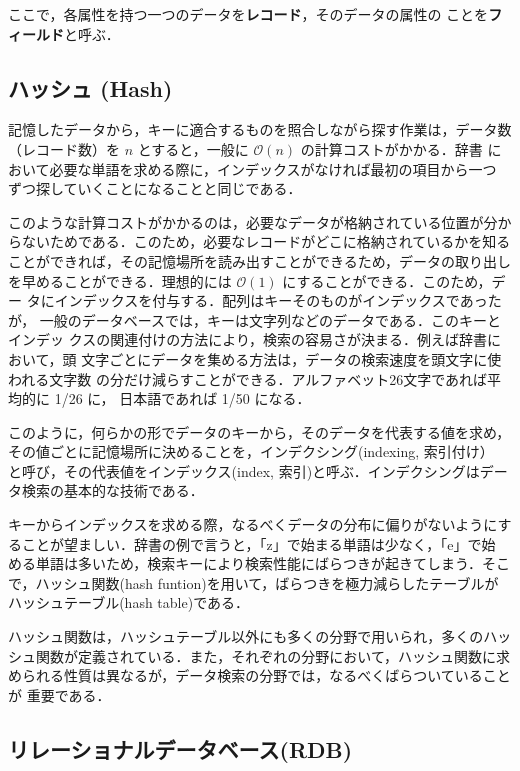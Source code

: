 ここで，各属性を持つ一つのデータを\textbf{レコード}，そのデータの属性の
ことを\textbf{フィールド}と呼ぶ．

\subsection{ハッシュ (Hash)}

記憶したデータから，キーに適合するものを照合しながら探す作業は，データ数
（レコード数）を $n$ とすると，一般に $\mathcal{O}(n)$ の計算コストがかかる．辞書
において必要な単語を求める際に，インデックスがなければ最初の項目から一つ
ずつ探していくことになることと同じである．

このような計算コストがかかるのは，必要なデータが格納されている位置が分か
らないためである．このため，必要なレコードがどこに格納されているかを知る
ことができれば，その記憶場所を読み出すことができるため，データの取り出し
を早めることができる．理想的には $\mathcal{O}(1)$ にすることができる．このため，デー
タにインデックスを付与する．配列はキーそのものがインデックスであったが，
一般のデータベースでは，キーは文字列などのデータである．このキーとインデッ
クスの関連付けの方法により，検索の容易さが決まる．例えば辞書において，頭
文字ごとにデータを集める方法は，データの検索速度を頭文字に使われる文字数
の分だけ減らすことができる．アルファベット26文字であれば平均的に 1/26 に，
日本語であれば 1/50 になる．

このように，何らかの形でデータのキーから，そのデータを代表する値を求め，
その値ごとに記憶場所に決めることを，インデクシング(indexing, 索引付け）
と呼び，その代表値をインデックス(index, 索引)と呼ぶ．インデクシングはデー
タ検索の基本的な技術である．

キーからインデックスを求める際，なるべくデータの分布に偏りがないようにす
ることが望ましい．辞書の例で言うと，「z」で始まる単語は少なく，「e」で始
める単語は多いため，検索キーにより検索性能にばらつきが起きてしまう．そこ
で，ハッシュ関数(hash funtion)を用いて，ばらつきを極力減らしたテーブルが
ハッシュテーブル(hash table)である．

ハッシュ関数は，ハッシュテーブル以外にも多くの分野で用いられ，多くのハッ
シュ関数が定義されている．また，それぞれの分野において，ハッシュ関数に求
められる性質は異なるが，データ検索の分野では，なるべくばらついていることが
重要である．

\subsection{リレーショナルデータベース(RDB)}

